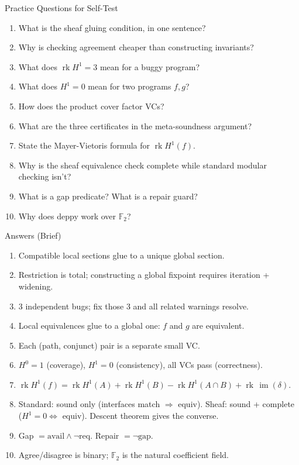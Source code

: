 \documentclass[aspectratio=169,10pt]{beamer}
\newcommand{\im}{\operatorname{im}}
\newcommand{\rk}{\operatorname{rk}}
\begin{document}
\begin{frame}{Practice Questions for Self-Test}
\begin{enumerate}
  \item What is the sheaf gluing condition, in one sentence?
  \item Why is checking agreement cheaper than constructing invariants?
  \item What does $\rk H^1 = 3$ mean for a buggy program?
  \item What does $H^1 = 0$ mean for two programs $f, g$?
  \item How does the product cover factor VCs?
  \item What are the three certificates in the meta-soundness argument?
  \item State the Mayer-Vietoris formula for $\rk H^1(f)$.
  \item Why is the sheaf equivalence check complete while standard modular checking isn't?
  \item What is a gap predicate? What is a repair guard?
  \item Why does deppy work over $\mathbb{F}_2$?
\end{enumerate}
\end{frame}

\begin{frame}{Answers (Brief)}
\footnotesize
\begin{enumerate}
  \item Compatible local sections glue to a unique global section.
  \item Restriction is total; constructing a global fixpoint requires iteration + widening.
  \item 3 independent bugs; fix those 3 and all related warnings resolve.
  \item Local equivalences glue to a global one: $f$ and $g$ are equivalent.
  \item Each (path, conjunct) pair is a separate small VC.
  \item $H^0 = 1$ (coverage), $H^1 = 0$ (consistency), all VCs pass (correctness).
  \item $\rk H^1(f) = \rk H^1(A) + \rk H^1(B) - \rk H^1(A \cap B) + \rk\,\im(\delta)$.
  \item Standard: sound only (interfaces match $\Rightarrow$ equiv). Sheaf: sound + complete ($H^1 = 0 \Leftrightarrow$ equiv). Descent theorem gives the converse.
  \item Gap $= \text{avail} \wedge \lnot\text{req}$. Repair $= \lnot\text{gap}$.
  \item Agree/disagree is binary; $\mathbb{F}_2$ is the natural coefficient field.
\end{enumerate}
\end{frame}
\end{document}
